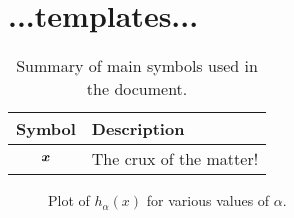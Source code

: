 \section{...templates...}

\begin{table}[!t]
  \centering
  \begin{tabular}{c p{}}
    \toprule
    Symbol & Description \\
    \toprule
    $\bm{x}$ & The crux of the matter!\\
    \bottomrule
  \end{tabular}
  \caption{Summary of main symbols used in the document.}
  \label{tbl:notation}
\end{table}

\begin{figure}[!ht]  
  \centering
  \caption{Plot of $h_\alpha(x)$ for various values of $\alpha$.}  
  \label{fig:power_norm}
 \end{figure}


